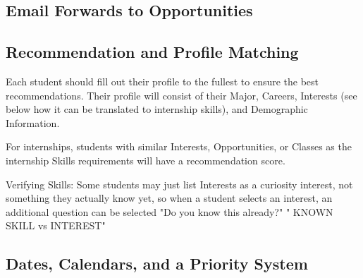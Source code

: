\documentclass[english]{proposalnsf}
\begin{document}
		
		\subsection{Email Forwards to Opportunities}
		
		
		\subsection{Recommendation and Profile Matching}
		Each student should fill out their profile to the fullest to ensure the best recommendations. Their profile will consist of their Major, Careers, Interests (see below how it can be translated to internship skills), and Demographic Information. 
		
		For internships, students with similar Interests, Opportunities, or Classes as the internship Skills requirements will have a recommendation score.
		
		Verifying Skills:
		Some students may just list Interests as a curiosity interest, not something they actually know yet, so when a student selects an interest, an additional question can be selected "Do you know this already?" " KNOWN SKILL vs INTEREST"
		
		
		
		\subsection{Dates, Calendars, and a Priority System}
		
	
\end{document}
